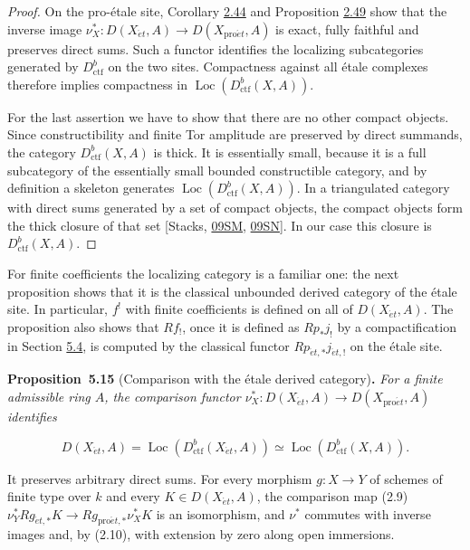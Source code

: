 \documentclass[11pt]{article}
\newenvironment{bpstatement}[2]{\par\addvspace{0.6\baselineskip}\noindent\textbf{#1}#2\textbf{.}\enspace\ignorespaces}
  {\par\addvspace{0.4\baselineskip}}
\newenvironment{bpstatementit}[2]{\begin{bpstatement}{#1}{#2}\itshape\ignorespaces}{\end{bpstatement}}
\providecommand{\Loc}{}\renewcommand{\Loc}{\operatorname{Loc}}
\begin{document}
\begin{proof}[{Proof}]
On the pro-étale site, Corollary \hyperref[bp132]{2.44} and Proposition \hyperref[bp146]{2.49} show that the inverse image \(\nu_X^*:D(X_{\acute{e}t},A)\to D(X_{\mathrm{pro}\acute{e}t},A)\) is exact, fully faithful and preserves direct sums. Such a functor identifies the localizing subcategories generated by \(D^b_{\mathrm{ctf}}\) on the two sites. Compactness against all étale complexes therefore implies compactness in \(\Loc(D^b_{\mathrm{ctf}}(X,A))\).

For the last assertion we have to show that there are no other compact objects. Since constructibility and finite Tor amplitude are preserved by direct summands, the category \(D^b_{\mathrm{ctf}}(X,A)\) is thick. It is essentially small, because it is a full subcategory of the essentially small bounded constructible category, and by definition a skeleton generates \(\Loc(D^b_{\mathrm{ctf}}(X,A))\). In a triangulated category with direct sums generated by a set of compact objects, the compact objects form the thick closure of that set [Stacks, \href{https://stacks.math.columbia.edu/tag/09SM}{09SM}, \href{https://stacks.math.columbia.edu/tag/09SN}{09SN}]. In our case this closure is \(D^b_{\mathrm{ctf}}(X,A)\).
\end{proof}

\label{bp453}%
For finite coefficients the localizing category is a familiar one: the next proposition shows that it is the classical unbounded derived category of the étale site. In particular, \(f^!\) with finite coefficients is defined on all of \(D(X_{\acute{e}t},A)\). The proposition also shows that \(Rf_!\), once it is defined as \(Rp_*j_!\) by a compactification in Section \hyperref[bp459]{5.4}, is computed by the classical functor \(Rp_{\acute{e}t,*}j_{\acute{e}t,!}\) on the étale site.

\label{bp454}%
\begin{bpstatementit}{Proposition~5.15}{ (Comparison with the étale derived category)}
For a finite admissible ring \(A\), the comparison functor \(\nu_X^*:D(X_{\acute{e}t},A)\to D(X_{\mathrm{pro}\acute{e}t},A)\) identifies

\[
D(X_{\acute{e}t},A)=\Loc(D^b_{\mathrm{ctf}}(X_{\acute{e}t},A))
\simeq\Loc(D^b_{\mathrm{ctf}}(X,A)).
\]

It preserves arbitrary direct sums. For every morphism \(g:X\to Y\) of schemes of finite type over \(k\) and every \(K\in D(X_{\acute{e}t},A)\), the comparison map (2.9) \(\nu_Y^*Rg_{\acute{e}t,*}K\to Rg_{\mathrm{pro}\acute{e}t,*}\nu_X^*K\) is an isomorphism, and \(\nu^*\) commutes with inverse images and, by (2.10), with extension by zero along open immersions.
\end{bpstatementit}
\end{document}
